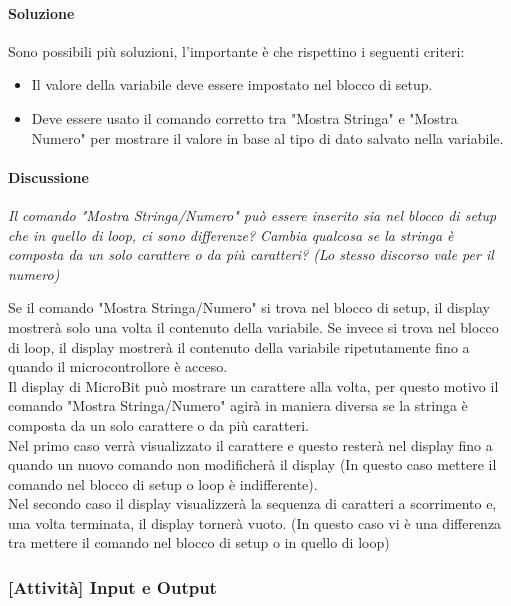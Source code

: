 \documentclass[../../docenti.tex]{subfiles}
\begin{document}
\paragraph{Soluzione}
Sono possibili più soluzioni, l'importante è che rispettino i seguenti criteri:
\begin{itemize}
	\item Il valore della variabile deve essere impostato nel blocco di setup.
	\item Deve essere usato il comando corretto tra "Mostra Stringa" e "Mostra Numero" per mostrare il valore in base al tipo di dato salvato nella variabile.
\end{itemize}

\paragraph{Discussione} \textit{Il comando "Mostra Stringa/Numero" può essere inserito sia nel blocco di setup che in quello di loop, ci sono differenze? Cambia qualcosa se la stringa è composta da un solo carattere o da più caratteri? (Lo stesso discorso vale per il numero)}


Se il comando "Mostra Stringa/Numero" si trova nel blocco di setup, il display mostrerà solo una volta il contenuto della variabile. Se invece si trova nel blocco di loop, il display mostrerà il contenuto della variabile ripetutamente fino a quando il microcontrollore è acceso.\\
Il display di MicroBit può mostrare un carattere alla volta, per questo motivo il comando "Mostra Stringa/Numero" agirà in maniera diversa se la stringa è composta da un solo carattere o da più caratteri.\\
Nel primo caso verrà visualizzato il carattere e questo resterà nel display fino a quando un nuovo comando non modificherà il display (In questo caso mettere il comando nel blocco di setup o loop è indifferente).\\
Nel secondo caso il display visualizzerà la sequenza di caratteri a  scorrimento e, una volta terminata, il display tornerà vuoto. (In questo caso vi è una differenza tra mettere il comando nel blocco di setup o in quello di loop)

\subsubsection{[Attività] Input e Output}
\end{document}
